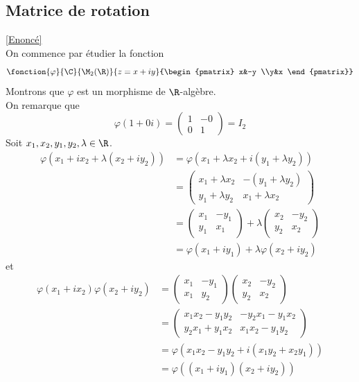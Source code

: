 \documentclass{book}
\begin{document}
	\subsection{Matrice de rotation}\label{sec:matrice-de-rotation}
		\textcolor{blue}{\hyperref[Matrice de rotation]{[Enoncé]}}\\
		On commence par étudier la fonction \[\fonction{\varphi}{\C}{\M_2(\R)}{z=x+iy}{\begin{pmatrix}
				x&-y \\y&x
		\end{pmatrix}}\]
	Montrons que $\varphi$ est un morphisme de $\R$-algèbre.\\
	On remarque que \[\varphi(1+0i)=\begin{pmatrix}
		1&-0\\0&1
	\end{pmatrix}=I_2\]
	Soit $x_1,x_2,y_1,y_2,\lambda\in\R$.\\
	\begin{align*}
		\varphi(x_1+ix_2+\lambda(x_2+iy_2))&=\varphi(x_1+\lambda x_2+i(y_1+\lambda y_2))\\&=\begin{pmatrix}
			x_1+\lambda x_2&-(y_1+\lambda y_2)\\
			y_1+\lambda y_2&x_1+\lambda x_2
		\end{pmatrix}\\&=\begin{pmatrix}
			x_1&-y_1\\y_1&x_1
		\end{pmatrix}+\lambda \begin{pmatrix}
			x_2&-y_2\\y_2&x_2
		\end{pmatrix}\\&=\varphi(x_1+iy_1)+\lambda\varphi(x_2+iy_2)
	\end{align*}
	et 
	\begin{align*}
		\varphi(x_1+ix_2)\varphi(x_2+iy_2)&=\begin{pmatrix}
			x_1&-y_1\\x_1&y_2
		\end{pmatrix}\begin{pmatrix}
		x_2&-y_2\\y_2&x_2
		\end{pmatrix}\\&=\begin{pmatrix}
		x_1x_2-y_1y_2&-y_2x_1-y_1x_2\\y_2x_1+y_1x_2&x_1x_2-y_1y_2		
		\end{pmatrix}\\&=\varphi(x_1x_2-y_1y_2+i(x_1y_2+x_2y_1))\\&=\varphi((x_1+iy_1)(x_2+iy_2))
	\end{align*}
\end{document}
